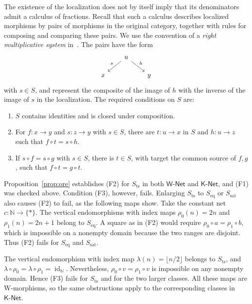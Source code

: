 \documentclass[11pt,a4paper]{article}
\theoremstyle{definition}
\theoremstyle{remark}
\newcommand{\Wpar}{\mathsf{W\text{-}Net}}
\newcommand{\Kpar}{\mathsf{K\text{-}Net}}
\newcommand{\NN}{\mathbb N}
\newcommand{\id}{\operatorname{id}}
\newcommand{\Sts}{S_{\mathrm{ts}}}
\newcommand{\Seq}{S_{\mathrm{eq}}}
\newcommand{\Ssat}{S_{\mathrm{sat}}}
\begin{document}
The existence of the localization does not by itself imply that its
denominators admit a calculus of fractions. Recall that such a
calculus describes localized morphisms by pairs of morphisms in the
original category, together with rules for composing and comparing
these pairs. We use the convention of a \emph{right multiplicative
system} in~\cite[Definition 4.27.1]{Stacks}. The pairs have the form
\[
\begin{tikzcd}[column sep=2em,row sep=1.5em]
& u \arrow[dl,"s"'] \arrow[dr,"h"] & \\
x & & y
\end{tikzcd}
\]
with \(s\in S\), and represent the composite of the image of
\(h\) with the inverse of the image of \(s\) in the localization.
The required conditions on \(S\) are:
\begin{enumerate}[label=(F\arabic*)]
\item \(S\) contains identities and is closed under composition.
\item For \(f:x\to y\) and \(s:z\to y\) with \(s\in S\),
there are \(t:u\to x\) in \(S\) and \(h:u\to z\) such that
\(f\circ t=s\circ h\).
\item If \(s\circ f=s\circ g\) with \(s\in S\), there is
\(t\in S\), with target the common source of \(f,g\), such that
\(f\circ t=g\circ t\).
\end{enumerate}

Proposition~\ref{prop:ore} establishes (F2) for \(\Sts\) in
both \(\Wpar\) and \(\Kpar\), and (F1) was checked above.
Condition (F3), however, fails. Enlarging \(\Sts\) to \(\Seq\)
or \(\Ssat\) also causes (F2) to fail, as the following maps
show.
Take the constant net \(c:\NN\to\{*\}\). The vertical
endomorphisms with index maps \(\rho_0(n)=2n\) and \(\rho_1(n)=2n+1\)
belong to \(\Seq\). A square as in (F2) would require
\(\rho_0\circ a=\rho_1\circ b\), which is impossible on a nonempty
domain because the two ranges are disjoint. Thus (F2) fails for
\(\Seq\) and \(\Ssat\).

The vertical endomorphism with index map
\(\lambda(n)=\lfloor n/2\rfloor\) belongs to \(\Sts\), and
\(\lambda\circ\rho_0=\lambda\circ\rho_1=\id_{\NN}\). Nevertheless,
\(\rho_0\circ v=\rho_1\circ v\) is impossible on any nonempty domain.
Hence (F3) fails for \(\Sts\) and for the two larger classes.
All these maps are W-morphisms, so the same obstructions apply to the
corresponding classes in \(\Kpar\).
\end{document}
